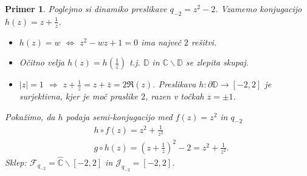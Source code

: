 \documentclass{article}
\newtheorem{primer}{Primer}
\newcommand{\C}{\mathbb{C}}
\newcommand{\D}{\mathbb{D}}
\newcommand{\F}{\mathcal{F}}
\begin{document}
\begin{primer}
Poglejmo si dinamiko preslikave $q_{-2} = z^2 - 2$. Vzamemo konjugacijo
$h(z) = z + \frac{1}{z}$.
\begin{itemize}
    \item $h(z) = w$ $\iff$ $z^2 - wz + 1 = 0$ ima največ $2$ rešitvi.
    \item Očitno velja $h(z) = h(\frac{1}{z})$ t.j. $\D$ in $\C \backslash \D$ 
    se zlepita skupaj.
    \item $|z| = 1$ $\Longrightarrow$ $z + \frac{1}{z} = z + \bar{z} = 2\Re(z)$. Preslikava 
    $h: \partial \D \rightarrow [-2, 2]$ je surjektivna, kjer je moč 
    praslike $2$, razen v točkah $z = \pm 1$.
\end{itemize}

\begin{center}
\end{center}
Pokažimo, da $h$ podaja semi-konjugacijo med $f(z) = z^2$ in 
$q_{-2}$
\begin{align*}
&h \circ f(z) = z^2 + \frac{1}{z^2} \\
&g\circ h(z) = \left(z + \frac{1}{z}\right)^2 - 2 = z^2 + \frac{1}{z^2}.
\end{align*}
Sklep: $\F_{q_{-2}} = \hat{\C}\backslash [-2, 2]$ in $\mathcal{J}_{q_{-2}} = [-2, 2]$.
\end{primer}
\end{document}
